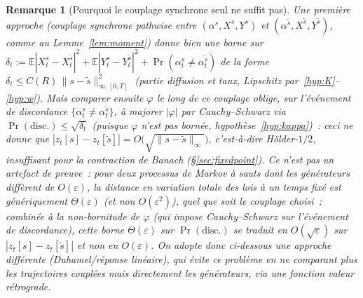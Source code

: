 \documentclass[11pt,a4paper]{article}
\newcommand{\E}{\mathbb{E}}
\theoremstyle{plain}
\newtheorem*{remark*}{Remarque}
\theoremstyle{definition}
\begin{document}
\begin{remark*}[Pourquoi le couplage synchrone seul ne suffit pas]
Une premi\`ere approche (couplage synchrone pathwise entre $(\alpha^s,X^s,Y^s)$ et $(\alpha^{\tilde s},X^{\tilde s},Y^{\tilde s})$, comme au Lemme~\ref{lem:moment}) donne bien une borne sur $\delta_t:=\E|X_t^s-X_t^{\tilde s}|^2+\E|Y_t^s-Y_t^{\tilde s}|^2+\Pr(\alpha_t^s\ne\alpha_t^{\tilde s})$ de la forme $\delta_t\le C(R)\,\|s-\tilde s\|_{\infty,[0,T]}^2$ (partie diffusion et taux, Lipschitz par~\ref{hyp:K}--\ref{hyp:w}). Mais comparer ensuite $\varphi$ le long de ce couplage oblige, sur l'\'ev\'enement de discordance $\{\alpha_t^s\ne\alpha_t^{\tilde s}\}$, \`a majorer $|\varphi|$ par Cauchy--Schwarz via $\Pr(\text{disc.})\le\sqrt{\delta_t}$ (puisque $\varphi$ n'est pas born\'ee, hypoth\`ese~\ref{hyp:kappa})~: ceci ne donne que $|z_t[s]-z_t[\tilde s]|=O\big(\sqrt{\|s-\tilde s\|_\infty}\big)$, c'est-\`a-dire H\"older-$1/2$, insuffisant pour la contraction de Banach (\S\ref{sec:fixedpoint}). Ce n'est pas un artefact de preuve~: pour deux processus de Markov \`a sauts dont les g\'en\'erateurs diff\`erent de $O(\varepsilon)$, la distance en variation totale des lois \`a un temps fix\'e est g\'en\'eriquement $\Theta(\varepsilon)$ (et non $O(\varepsilon^2)$), quel que soit le couplage choisi~; combin\'ee \`a la non-bornitude de $\varphi$ (qui impose Cauchy--Schwarz sur l'\'ev\'enement de discordance), cette borne $\Theta(\varepsilon)$ sur $\Pr(\text{disc.})$ se traduit en $O(\sqrt\varepsilon)$ sur $|z_t[s]-z_t[\tilde s]|$ et non en $O(\varepsilon)$. On adopte donc ci-dessous une approche diff\'erente (Duhamel/r\'eponse lin\'eaire), qui \'evite ce probl\`eme en ne comparant plus les \emph{trajectoires} coupl\'ees mais directement les \emph{g\'en\'erateurs}, via une fonction valeur r\'etrograde.
\end{remark*}
\end{document}
